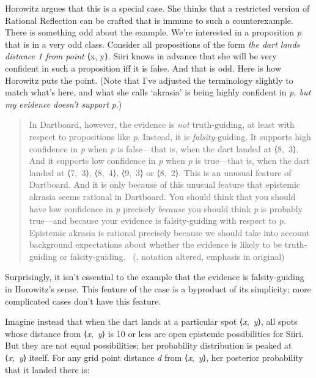 \documentclass[
  10pt,
  letterpaper,
  twoside]{scrbook}
\begin{document}
Horowitz argues that this is a special case. She thinks that a
restricted version of Rational Reflection can be crafted that is immune
to such a counterexample. There is something odd about the example.
We're interested in a proposition \emph{p} that is in a very odd class.
Consider all propositions of the form \emph{the dart lands distance 1
from point} ⟨x, y⟩. {Siiri} knows in advance that she will be very
confident in such a proposition iff it is false. And that is odd. Here
is how Horowitz puts the point. (Note that I've adjusted the terminology
slightly to match what's here, and what she calls `akrasia' is being
highly confident in \emph{p, but my evidence doesn't support p}.)

\begin{quote}
In Dartboard, however, the evidence is \emph{not} truth-guiding, at
least with respect to propositions like \emph{p}. Instead, it is
\emph{falsity}-guiding. It supports high confidence in \emph{p} when
\emph{p} is false---that is, when the dart landed at ⟨8,~3⟩. And it
supports low confidence in \emph{p} when \emph{p} is true---that is,
when the dart landed at ⟨7,~3⟩, ⟨8,~4⟩, ⟨9,~3⟩ or ⟨8,~2⟩. This is an
unusual feature of Dartboard. And it is only because of this unusual
feature that epistemic akrasia seems rational in Dartboard. You should
think that you should have low confidence in \emph{p} precisely
\emph{because} you should think \emph{p} is probably true---and because
your evidence is falsity-guiding with respect to \emph{p}. Epistemic
akrasia is rational precisely because we should take into account
background expectations about whether the evidence is likely to be
truth-guiding or falsity-guiding. ~(, notation altered, emphasis in original)
\end{quote}

Surprisingly, it isn't essential to the example that the evidence is
falsity-guiding in Horowitz's sense. This feature of the case is a
byproduct of its simplicity; more complicated cases don't have this
feature.

Imagine instead that when the dart lands at a particular spot
⟨\emph{x},~\emph{y}⟩, all spots whose distance from ⟨\emph{x},~\emph{y}⟩
is 10 or less are open epistemic possibilities for {Siiri}. But they are
not equal possibilities; her probability distribution is peaked at
⟨\emph{x},~\emph{y}⟩ itself. For any grid point distance \emph{d} from
⟨\emph{x},~\emph{y}⟩, her posterior probability that it landed there is:
\end{document}
